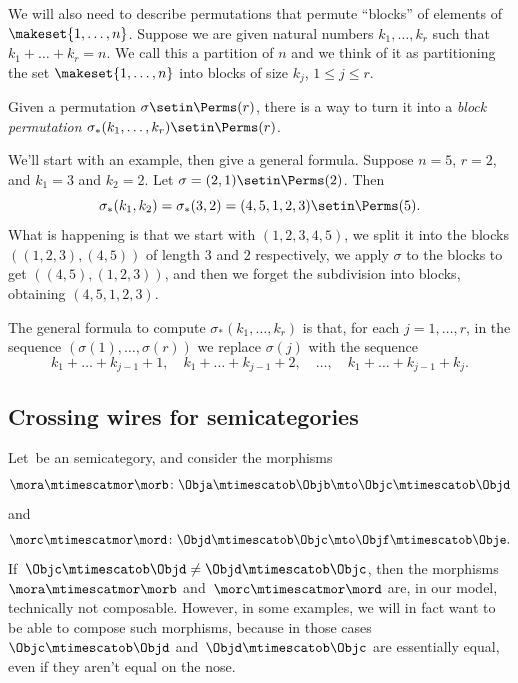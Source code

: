 We will also need to describe permutations that permute ``blocks'' of elements of $\makeset{1, \dots, n}$.
Suppose we are given natural numbers $k_1, \dots, k_r$ such that $k_1 + \dots + k_r = n$.
We call this a partition of $n$ and we think of it as partitioning the set $\makeset{1, \dots, n}$ into blocks of size $k_j$, $1 \leq j \leq r$.

Given a permutation $\sigma \setin \Perms(r)$, there is a way to turn it into a \emph{block permutation} $\sigma_*(k_1, \dots, k_r) \setin\Perms(r)$.

We'll start with an example, then give a general formula.
Suppose $n = 5$, $r=2$, and $k_1 = 3$ and $k_2 = 2$.
Let $\sigma = (2, 1) \setin \Perms(2)$.
Then
$$
    \sigma_*(k_1, k_2) = \sigma_*(3,2) = (4,5,1,2,3) \setin \Perms(5).
$$
What is happening is that we start with $(1,2,3,4,5)$, we split it into the blocks $((1,2,3),(4,5))$ of length $3$ and $2$ respectively, we apply $\sigma$ to the blocks to get $((4,5),(1,2,3))$, and then we forget the subdivision into blocks, obtaining $(4,5,1,2,3)$.

The general formula to compute $\sigma_*(k_1,\dots, k_r)$ is that, for each $j = 1, \dots, r$, in the sequence $(\sigma(1), \dots, \sigma(r))$ we replace $\sigma(j)$ with the sequence
$$
    k_1 + \dots + k_{j-1} + 1, \quad k_1 + \dots + k_{j-1} + 2, \quad \dots, \quad k_1 + \dots + k_{j-1} + k_j.
$$

\subsection{Crossing wires for semicategories}

Let~\CatC be an  semicategory, and consider the morphisms
\begin{equation}
    \mora \mtimescatmor \morb \colon \Obja \mtimescatob \Objb \mto \Objc \mtimescatob \Objd
\end{equation}
and
\begin{equation}
    \morc \mtimescatmor \mord \colon \Objd \mtimescatob \Objc \mto \Objf \mtimescatob \Obje.
\end{equation}
If~$\Objc \mtimescatob \Objd \neq \Objd \mtimescatob \Objc$, then the morphisms~$\mora \mtimescatmor \morb$ and~$\morc \mtimescatmor \mord$ are, in our model, technically not composable.
However, in some examples, we will in fact want to be able to compose such morphisms, because in those cases~$\Objc \mtimescatob \Objd$ and~$\Objd \mtimescatob \Objc$ are essentially equal, even if they aren't equal on the nose.

